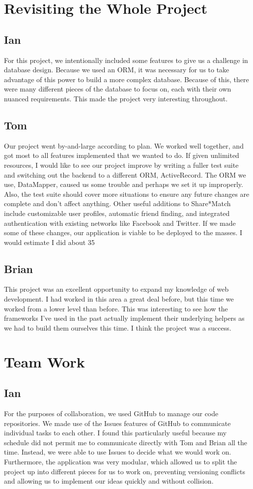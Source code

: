 \documentclass{acm_proc_article-sp}
\begin{document}
\section{Revisiting the Whole Project}
\subsection{Ian}
For this project, we intentionally included some features to give us a challenge in database design. Because we used an ORM, it was necessary for us to take advantage of this power to build a more complex database. Because of this, there were many different pieces of the database to focus on, each with their own nuanced requirements. This made the project very interesting throughout.
\subsection{Tom}
Our project went by-and-large according to plan. We worked well together, and got most to all features implemented that we wanted to do.
If given unlimited resources, I would like to see our project improve by writing a fuller test suite and switching out the backend to a different ORM, ActiveRecord. The ORM we use, DataMapper, caused us some trouble and perhaps we set it up improperly. Also, the test suite should cover more situations to ensure any future changes are complete and don't affect anything.
Other useful additions to Share*Match include customizable user profiles, automatic friend finding, and integrated authentication with existing networks like Facebook and Twitter. If we made some of these changes, our application is viable to be deployed to the masses.
I would estimate I did about 35%

\subsection{Brian}
This project was an excellent opportunity to expand my knowledge of web development.  I had worked in this area a great deal before, but this time we worked from a lower level than before.  This was interesting to see how the frameworks I've used in the past actually implement their underlying helpers as we had to build them ourselves this time.  I think the project was a success.
\section{Team Work}
\subsection{Ian}
For the purposes of collaboration, we used GitHub to manage our code repositories. We made use of the Issues features of GitHub to communicate individual tasks to each other. I found this particularly useful because my schedule did not permit me to communicate directly with Tom and Brian all the time. Instead, we were able to use Issues to decide what we would work on. Furthermore, the application was very modular, which allowed us to split the project up into different pieces for us to work on, preventing versioning conflicts and allowing us to implement our ideas quickly and without collision.
\end{document}
